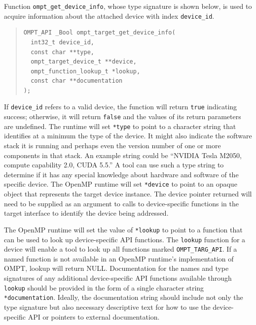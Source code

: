 \documentclass{article}
\begin{document}
Function \lstinline|ompt_get_device_info|, whose type signature is shown below, is used to acquire information about the attached device with  index \lstinline|device_id|. 
\begin{quote}
\begin{lstlisting}
OMPT_API _Bool ompt_target_get_device_info(
  int32_t device_id, 
  const char **type, 
  ompt_target_device_t **device,
  ompt_function_lookup_t *lookup,
  const char **documentation
);
\end{lstlisting}
\end{quote}
If \lstinline|device_id| refers to a valid device, the function will return \lstinline|true| indicating success; otherwise, it will return \lstinline|false| and the values of its return parameters are undefined. The runtime will set \lstinline|*type| to point to a character string that identifies at a minimum the  type of the device. It might also indicate the software stack it is running and perhaps even the version number of one or more components in that stack. An example string could be ``NVIDIA Tesla M2050, compute capability 2.0, CUDA 5.5.'' A tool can use such a type string to determine if it has any special knowledge about hardware and software of the specific device. The OpenMP runtime will set \lstinline|*device| to point to an opaque object that represents the target device instance. The device pointer returned will need to be supplied as an argument to calls to device-specific functions in the target interface to identify the device being addressed.

The OpenMP runtime will set the value of \lstinline|*lookup| to point to a function that can be used to look up device-specific API functions.  The \lstinline|lookup| function for a device will enable a tool to look up all functions marked \lstinline|OMPT_TARG_API|.  If a named function is not available in an OpenMP runtime's implementation of OMPT, lookup will return NULL. Documentation for the names and type signatures of any additional device-specific API functions available through \lstinline|lookup| should be provided in the form of a single character string \lstinline|*documentation|. Ideally, the documentation string should include not only the type signature but also necessary descriptive text for how to use the device-specific API or pointers to external documentation.
\end{document}
